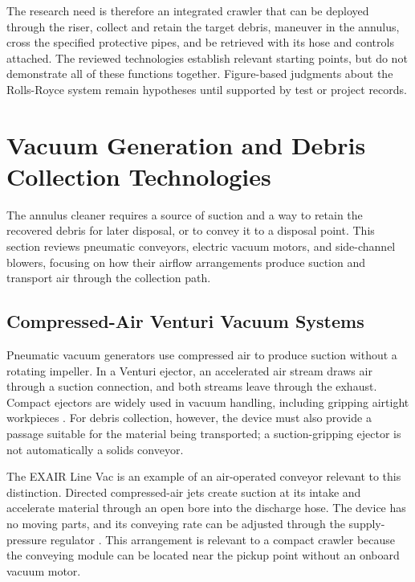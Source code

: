 The research need is therefore an integrated crawler that can be deployed through the riser, collect and retain the target debris, maneuver in the annulus, cross the specified protective pipes, and be retrieved with its hose and controls attached. The reviewed technologies establish relevant starting points, but do not demonstrate all of these functions together. Figure-based judgments about the Rolls-Royce system remain hypotheses until supported by test or project records.
\par
\endgroup

\section{Vacuum Generation and Debris Collection Technologies}
\label{sec:vacuum-technologies}
\begingroup
\setlength{\emergencystretch}{2em}

The annulus cleaner requires a source of suction and a way to retain the recovered debris for later disposal, or to convey it to a disposal point. This section reviews pneumatic conveyors, electric vacuum motors, and side-channel blowers, focusing on how their airflow arrangements produce suction and transport air through the collection path.

\subsection{Compressed-Air Venturi Vacuum Systems}
\label{sec:venturi-vacuums}
Pneumatic vacuum generators use compressed air to produce suction without a rotating impeller. In a Venturi ejector, an accelerated air stream draws air through a suction connection, and both streams leave through the exhaust. Compact ejectors are widely used in vacuum handling, including gripping airtight workpieces \citep{schmalzVacuumEjectors}. For debris collection, however, the device must also provide a passage suitable for the material being transported; a suction-gripping ejector is not automatically a solids conveyor.

The EXAIR Line Vac is an example of an air-operated conveyor relevant to this distinction. Directed compressed-air jets create suction at its intake and accelerate material through an open bore into the discharge hose. The device has no moving parts, and its conveying rate can be adjusted through the supply-pressure regulator \citep{exairLineVacCatalog}. This arrangement is relevant to a compact crawler because the conveying module can be located near the pickup point without an onboard vacuum motor.

